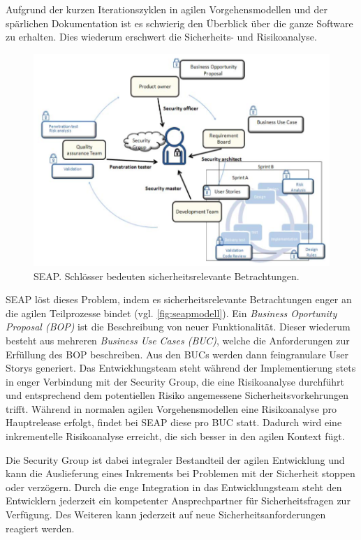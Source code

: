 Aufgrund der kurzen Iterationszyklen in agilen Vorgehensmodellen und der spärlichen Dokumentation ist es schwierig den Überblick über die ganze Software zu erhalten.
Dies wiederum erschwert die Sicherheits- und Risikoanalyse.

\begin{figure}
  \centering
  \includegraphics[width=\textwidth]{img/seapmodell.png}
  \caption{SEAP. Schlösser bedeuten sicherheitsrelevante Betrachtungen. \parencite[][S. 14]{Baca:2015aa}}
  \label{fig:seapmodell}
\end{figure}

SEAP löst dieses Problem, indem es sicherheitsrelevante Betrachtungen enger an die agilen Teilprozesse bindet (vgl. \autoref{fig:seapmodell}).
Ein \emph{Business Oportunity Proposal (BOP)} ist die Beschreibung von neuer Funktionalität.
Dieser wiederum besteht aus mehreren \emph{Business Use Cases (BUC)}, welche die Anforderungen zur Erfüllung des BOP beschreiben.
Aus den BUCs werden dann feingranulare User Storys generiert.
Das Entwicklungsteam steht während der Implementierung stets in enger Verbindung mit der Security Group, die eine Risikoanalyse durchführt und entsprechend dem potentiellen Risiko angemessene Sicherheitsvorkehrungen trifft.
Während in normalen agilen Vorgehensmodellen eine Risikoanalyse pro Hauptrelease erfolgt, findet bei SEAP diese pro BUC statt.
Dadurch wird eine inkrementelle Risikoanalyse erreicht, die sich besser in den agilen Kontext fügt.
\parencite[Vgl.][S. 15]{Baca:2015aa}

Die Security Group ist dabei integraler Bestandteil der agilen Entwicklung und kann die Auslieferung eines Inkrements bei Problemen mit der Sicherheit stoppen oder verzögern. 
Durch die enge Integration in das Entwicklungsteam steht den Entwicklern jederzeit ein kompetenter Ansprechpartner für Sicherheitsfragen zur Verfügung.
Des Weiteren kann jederzeit auf neue Sicherheitsanforderungen reagiert werden.
\parencite[Vgl.][S. 15]{Baca:2015aa}

